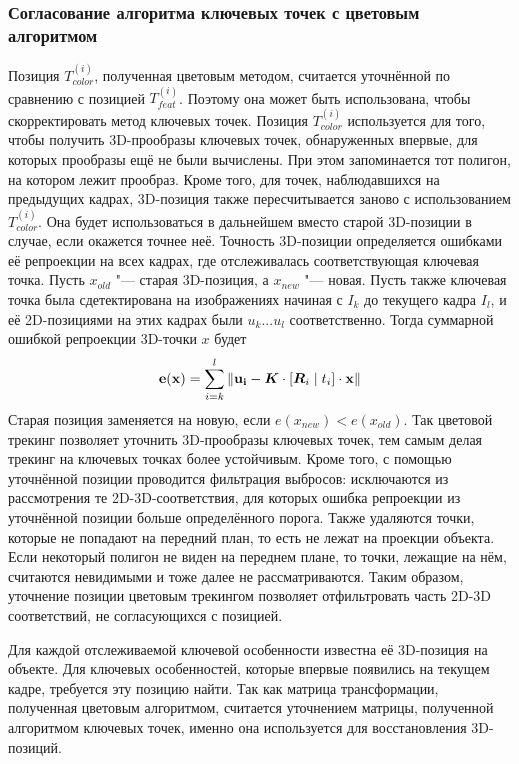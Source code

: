 \subsubsection*{Согласование алгоритма ключевых точек с цветовым алгоритмом}
Позиция $T_{color}^{(i)}$, полученная цветовым методом, считается уточнённой по
сравнению с позицией $T_{feat}^{(i)}$. Поэтому она может быть использована,
чтобы скорректировать метод ключевых точек.
Позиция $T_{color}^{(i)}$ используется для того, чтобы получить 3D-прообразы
ключевых точек, обнаруженных впервые, для которых прообразы ещё не были
вычислены. При этом запоминается тот полигон, на котором лежит прообраз. Кроме
того, для точек, наблюдавшихся на предыдущих кадрах, 3D-позиция также
пересчитывается заново с использованием $T_{color}^{(i)}$. Она будет
использоваться в дальнейшем вместо старой 3D-позиции в случае, если окажется
точнее неё.
Точность 3D-позиции определяется ошибками её репроекции на всех кадрах, где
отслеживалась соответствующая ключевая точка. Пусть $x_{old}$ "--- старая
3D-позиция, а $x_{new}$ "--- новая. Пусть также ключевая точка была
сдетектирована на изображениях начиная с $I_k$ до текущего кадра $I_l$, и её
2D-позициями на этих кадрах были $u_k ... u_l$ соответственно. Тогда суммарной
ошибкой репроекции 3D-точки $x$ будет
\begin{equation} \label{eqn:sum_reproj} \mathbf{e}(\mathbf{x}) = \sum\limits_{i =
k}^l \| \mathbf{u_i} - \bm{K} \cdot [\bm{R}_i \mid \mathnormal{t}_i] \cdot \mathbf{x} \|
\end{equation}
Старая позиция заменяется на новую, если $e(x_{new}) < e(x_{old})$. Так
цветовой трекинг позволяет уточнить 3D-прообразы ключевых точек, тем самым
делая трекинг на ключевых точках более устойчивым.
Кроме того, с помощью уточнённой позиции проводится фильтрация выбросов:
исключаются из рассмотрения те 2D-3D-соответствия, для которых ошибка
репроекции из уточнённой позиции больше определённого порога. Также удаляются
точки, которые не попадают на передний план, то есть не лежат на проекции
объекта. Если некоторый полигон не виден на переднем плане, то точки, лежащие
на нём, считаются невидимыми и тоже далее не рассматриваются. Таким образом,
уточнение позиции цветовым трекингом позволяет отфильтровать часть 2D-3D
соответствий, не согласующихся с позицией.

Для каждой отслеживаемой ключевой особенности известна её 3D-позиция на
объекте. Для ключевых особенностей, которые впервые появились на текущем кадре,
требуется эту позицию найти. Так как матрица трансформации, полученная цветовым
алгоритмом, считается уточнением матрицы, полученной алгоритмом ключевых точек,
именно она используется для восстановления 3D-позиций.

